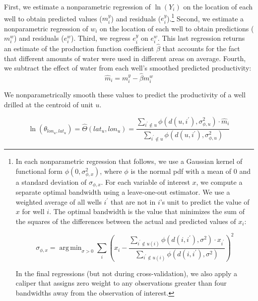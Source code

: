 \documentclass[12pt]{article}
\DeclareMathOperator*{\argmin}{arg\,min}
\begin{document}
First, we estimate a nonparametric regression of $\ln(Y_i)$ on the location of each well to obtain predicted values ($m^y_i$) and residuals ($e^y_i$).\footnote{
	In each nonparametric regression that follows, we use a Gaussian kernel of functional form $\phi(0, \sigma^2_{\phi,x})$, where $\phi$ is the normal pdf with a mean of $0$ and a standard deviation of $\sigma_{\phi,x}$. For each variable of interest $x$, we compute a separate optimal bandwidth using a leave-one-out estimator. We use a weighted average of all wells $i^{\prime}$ that are not in $i$'s unit to predict the value of $x$ for well $i$. The optimal bandwidth is the value that minimizes the sum of the squares of the differences between the actual and predicted values of $x_i$:
	
	\begin{equation}
	\sigma_{\phi,x} = \argmin_{\sigma > 0} \sum_i  \left( x_i -\dfrac{ \sum_{i^{\prime} \notin u(i)} \phi( d(i, i^{\prime}), \sigma^2) \cdot x_{i^{\prime}}  }{ \sum_{i^{\prime} \notin u(i)} \phi( d(i,i^{\prime}), \sigma^2) } \right)^2
	\end{equation}
	
	\noindent In the final regressions (but not during cross-validation), we also apply a caliper that assigns zero weight to any observations greater than four bandwidths away from the observation of interest.

} Second, we estimate a nonparametric regression of $w_i$ on the location of each well to obtain predictions ($m^{w}_i$) and residuals ($e^{w}_i$). Third, we regress $e^y_i$ on $e^{w}_i$.  This last regression returns an estimate of the production function coefficient $\hat{\beta}$ that accounts for the fact that different amounts of water were used in different areas on average. Fourth, we subtract the effect of water from each well's smoothed predicted productivity:
\begin{equation}
\hat{m}_i = m^y_i - \hat{\beta} m^{w}_i
\end{equation}

\noindent We nonparametrically smooth these values to predict the productivity of a well drilled at the centroid of unit $u$.

\begin{equation}
\ln(\theta_{lon_u,lat_u}) = \widehat{\Theta}(lat_u,lon_u) = \dfrac{ \sum_{i^{\prime} \notin u} \phi( d(u, i^{\prime}), \sigma^2_{\phi,u}) \cdot \hat{m}_i  }{ \sum_{i^{\prime} \notin u} \phi( d(u, i^{\prime}), \sigma^2_{\phi,u}) }
\end{equation}
\end{document}
